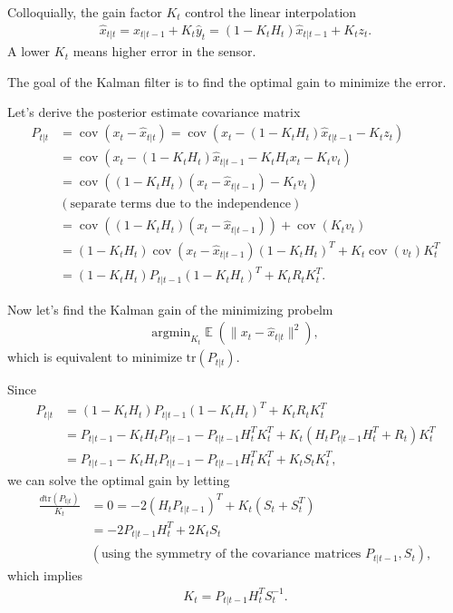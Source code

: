 \documentclass{article}
\newcommand{\cov}{\operatorname{cov}}
\DeclareMathOperator{\ex}{\mathbb{E}}
\begin{document}
Colloquially, the gain factor $K_{t}$ control the linear interpolation
\begin{align*}
  \hat{x}_{t|t} = \hat{x}_{t|t-1} + K_{t} \hat{y}_{t}
  = (1 - K_{t} H_{t}) \hat{x}_{t|t-1} + K_{t} z_{t}
.\end{align*}
A lower $K_{t}$ means higher error in the sensor.

The goal of the Kalman filter is to find the optimal gain to minimize
the error.

Let's derive the posterior estimate covariance matrix
\begin{align*}
  P_{t|t}
  &= \cov(x_{t} - \hat{x}_{t|t})
  = \cov(x_{t} - (1 - K_{t} H_{t}) \hat{x}_{t|t-1} - K_{t} z_{t})\\
  &= \cov(x_{t} - (1 - K_{t} H_{t}) \hat{x}_{t|t-1} - K_{t} H_{t}x_{t} - K_{t}v_{t})\\
  &= \cov((1 - K_{t} H_{t})(x_{t} - \hat{x}_{t|t-1}) - K_{t}v_{t})\\
  &(\text{separate terms due to the independence})\\
  &= \cov((1 - K_{t} H_{t})(x_{t} - \hat{x}_{t|t-1})) + \cov(K_{t}v_{t})\\
  &= (1 - K_{t} H_{t})\cov(x_{t} - \hat{x}_{t|t-1})(1 - K_{t} H_{t})^{T}
  + K_{t}\cov(v_{t})K_{t}^{T}\\
  &= (1 - K_{t} H_{t})P_{t|t-1}(1 - K_{t} H_{t})^{T} + K_{t}R_{t}K_{t}^{T}
.\end{align*}

Now let's find the Kalman gain of the minimizing probelm
\begin{align*}
  \text{argmin}_{K_{t}} \ex{(\|x_{t} - \hat{x}_{t|t}\|^{2})}
,\end{align*}
which is equivalent to minimize $\text{tr}(P_{t|t})$.

Since
\begin{align*}
  P_{t|t}
  &= (1 - K_{t} H_{t})P_{t|t-1}(1 - K_{t} H_{t})^{T} + K_{t}R_{t}K_{t}^{T}\\
  &= P_{t|t-1} - K_{t}H_{t}P_{t|t-1} - P_{t|t-1}H_{t}^{T}K_{t}^{T}
  + K_{t}(H_{t}P_{t|t-1}H_{t}^{T} + R_{t})K_{t}^{T}\\
  &= P_{t|t-1} - K_{t}H_{t}P_{t|t-1} - P_{t|t-1}H_{t}^{T}K_{t}^{T}
  + K_{t}S_{t}K_{t}^{T}
,\end{align*}
we can solve the optimal gain by letting
\begin{align*}
  \frac{d \text{tr}(P_{t|t})}{K_{t}}
  &= 0
  = -2 (H_{t}P_{t|t-1})^{T} + K_{t}(S_{t} + S_{t}^{T})\\
  &= -2 P_{t|t-1}H_{t}^{T} + 2 K_{t}S_{t}\\
  &(\text{using the symmetry of the covariance matrices } P_{t|t-1}, S_{t})
,\end{align*}
which implies
\begin{align*}
  K_{t} = P_{t|t-1}H_{t}^{T}S_{t}^{-1}
.\end{align*}
\end{document}
